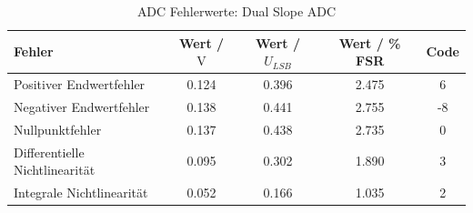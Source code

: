 \begin{table}[htbp]
\centering
\caption{ADC Fehlerwerte: Dual Slope ADC}
\label{tab:dual_slope_adc_errors}
\begin{tabular}{lcccc}
Fehler & Wert / $\si{\volt}$ & Wert / $U_{LSB}$ & Wert / \% FSR & Code \\
\midrule
{\cellcolor[HTML]{FF8438} Positiver Endwertfehler} & 0.124 & 0.396 & 2.475 & 6 \\
{\cellcolor[HTML]{35CCFF} Negativer Endwertfehler} & 0.138 & 0.441 & 2.755 & -8 \\
{\cellcolor[HTML]{8FFF5B} Nullpunktfehler} & 0.137 & 0.438 & 2.735 & 0 \\
{\cellcolor[HTML]{FFEC21} Differentielle Nichtlinearität} & 0.095 & 0.302 & 1.890 & 3 \\
{\cellcolor[HTML]{FF728A} Integrale Nichtlinearität} & 0.052 & 0.166 & 1.035 & 2 \\
\end{tabular}
\end{table}
